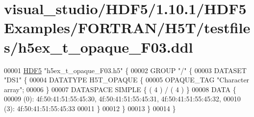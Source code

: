 \hypertarget{visual__studio_2_h_d_f5_21_810_81_2_h_d_f5_examples_2_f_o_r_t_r_a_n_2_h5_t_2testfiles_2h5ex__t__opaque___f03_8ddl_source}{}\section{visual\+\_\+studio/\+H\+D\+F5/1.10.1/\+H\+D\+F5\+Examples/\+F\+O\+R\+T\+R\+A\+N/\+H5\+T/testfiles/h5ex\+\_\+t\+\_\+opaque\+\_\+\+F03.ddl}
\label{visual__studio_2_h_d_f5_21_810_81_2_h_d_f5_examples_2_f_o_r_t_r_a_n_2_h5_t_2testfiles_2h5ex__t__opaque___f03_8ddl_source}

\begin{DoxyCode}
00001 \hyperlink{namespace_h_d_f5}{HDF5} \textcolor{stringliteral}{"h5ex\_t\_opaque\_F03.h5"} \{
00002 GROUP \textcolor{stringliteral}{"/"} \{
00003    DATASET \textcolor{stringliteral}{"DS1"} \{
00004       DATATYPE  H5T\_OPAQUE \{
00005          OPAQUE\_TAG \textcolor{stringliteral}{"Character array"};
00006       \}
00007       DATASPACE  SIMPLE \{ ( 4 ) / ( 4 ) \}
00008       DATA \{
00009       (0): 4f:50:41:51:55:45:30, 4f:50:41:51:55:45:31, 4f:50:41:51:55:45:32,
00010       (3): 4f:50:41:51:55:45:33
00011       \}
00012    \}
00013 \}
00014 \}
\end{DoxyCode}
